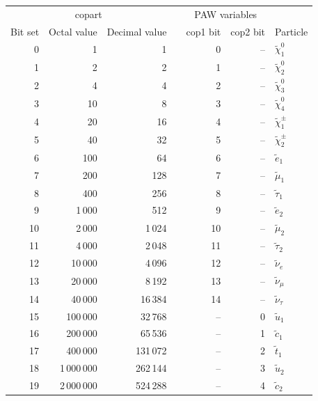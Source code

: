 \documentclass[a4paper,10pt,oneside]{book}
\newcommand{\code}[1]{\ft{#1}}
\newcommand{\ft}[1]{\textsf{#1}}
\begin{document}
\begin{table}[!h]
\centering
\begin{tabular}{rrrcrrl} \hline
\multicolumn{3}{c}{\code{copart}} & & \multicolumn{2}{c}{PAW variables} \\ \cline{1-3} \cline{5-6}
Bit set & Octal value & Decimal value && \code{cop1} bit & \code{cop2} bit & Particle \\ \hline
 0 &             1 &            1 &&   0 &  -- & $\tilde{\chi}_1^0$ \\
 1 &             2 &            2 &&   1 &  -- & $\tilde{\chi}_2^0$ \\
 2 &             4 &            4 &&   2 &  -- & $\tilde{\chi}_3^0$ \\
 3 &            10 &            8 &&   3 &  -- & $\tilde{\chi}_4^0$ \\ \hline
 4 &            20 &           16 &&   4 &  -- & $\tilde{\chi}_1^\pm$ \\
 5 &            40 &           32 &&   5 &  -- & $\tilde{\chi}_2^\pm$ \\ \hline
 6 &           100 &           64 &&   6 &  -- & $\tilde{e}_1$ \\
 7 &           200 &          128 &&   7 &  -- & $\tilde{\mu}_1$ \\
 8 &           400 &          256 &&   8 &  -- & $\tilde{\tau}_1$ \\
 9 &        1\,000 &          512 &&   9 &  -- & $\tilde{e}_2$ \\
10 &        2\,000 &       1\,024 &&  10 &  -- & $\tilde{\mu}_2$ \\
11 &        4\,000 &       2\,048 &&  11 &  -- & $\tilde{\tau}_2$ \\ \hline
12 &       10\,000 &       4\,096 &&  12 &  -- & $\tilde{\nu}_e$ \\
13 &       20\,000 &       8\,192 &&  13 &  -- & $\tilde{\nu}_\mu$ \\
14 &       40\,000 &      16\,384 &&  14 &  -- & $\tilde{\nu}_\tau$ \\ \hline
15 &      100\,000 &      32\,768 &&  -- &   0 & $\tilde{u}_1$ \\
16 &      200\,000 &      65\,536 &&  -- &   1 & $\tilde{c}_1$ \\
17 &      400\,000 &     131\,072 &&  -- &   2 & $\tilde{t}_1$ \\
18 &   1\,000\,000 &     262\,144 &&  -- &   3 & $\tilde{u}_2$ \\
19 &   2\,000\,000 &     524\,288 &&  -- &   4 & $\tilde{c}_2$ \\

\end{tabular}
\end{table}
\end{document}
